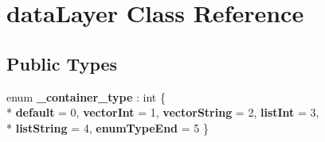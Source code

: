 \hypertarget{classdata_layer}{}\section{data\+Layer Class Reference}
\label{classdata_layer}
\subsection*{Public Types}
\begin{DoxyCompactItemize}
\item 
\hypertarget{classdata_layer_a705d65c89e886e8e8eed3a471a9f920c}{}enum {\bfseries \+\_\+container\+\_\+type} \+: int \{ \\*
{\bfseries default} = 0, 
{\bfseries vector\+Int} = 1, 
{\bfseries vector\+String} = 2, 
{\bfseries list\+Int} = 3, 
\\*
{\bfseries list\+String} = 4, 
{\bfseries enum\+Type\+End} = 5
 \}\label{classdata_layer_a705d65c89e886e8e8eed3a471a9f920c}

\end{DoxyCompactItemize}
